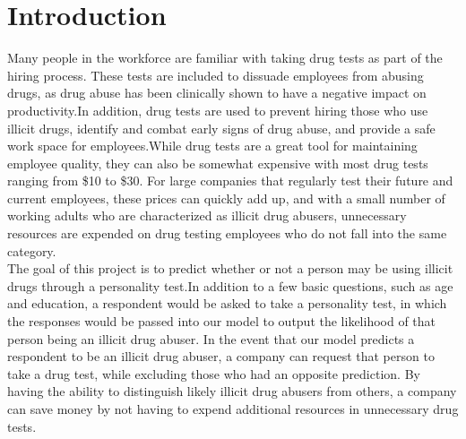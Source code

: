\section{Introduction}

\vspace{-1.5pt}

Many people in the workforce are familiar with taking drug tests as part of the hiring process. These tests are included to dissuade employees from abusing drugs, as drug abuse has been clinically shown to have a negative impact on productivity.\hspace{1pt}In addition, drug tests are used to prevent hiring those who use illicit drugs, identify and combat early signs of drug abuse, and provide a safe work space for employees\cite{workplace-drug-testing}.While drug tests are a great tool for maintaining employee quality, they can also be somewhat expensive with most drug tests ranging from \$10 to \$30\cite{drug-testing}. For large companies that regularly test their future and current employees, these prices can quickly add up, and with a small number of working adults who are characterized as illicit drug abusers, unnecessary resources are expended on drug testing employees who do not fall into the same category.\\

The goal of this project is to predict whether or not a person may be using illicit drugs through a personality test.\hspace{1pt}In addition to a few basic questions, such as age and education, a respondent would be asked to take a personality test, in which the responses would be passed into our model to output the likelihood of that person being an illicit drug abuser. In the event that our model predicts a respondent to be an illicit drug abuser, a company can request that person to take a drug test, while excluding those who had an opposite prediction. By having the ability to distinguish likely illicit drug abusers from others, a company can save money by not having to expend additional resources in unnecessary drug tests.